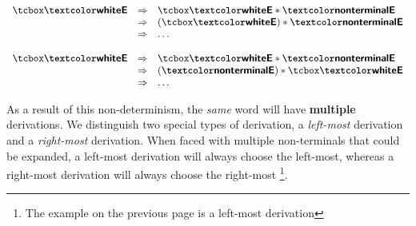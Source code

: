 \begin{center}
\begin{minipage}[t]{0.25\textwidth}
    \centering
     $\begin{array}{rcl}
      {\selectedNonTerminal{E}} &\Rightarrow& {\selectedNonTerminal{E} * \nonterminal{E}} \\
      &\Rightarrow& (\selectedNonTerminal{E}) * \nonterminal{E}\\
     &\Rightarrow& \ldots\\
    \end{array}$
\end{minipage}%
\begin{minipage}[t]{0.25\textwidth}
    \centering
    $\begin{array}{rcl}
     {\selectedNonTerminal{E}} &\Rightarrow& {\selectedNonTerminal{E} * \nonterminal{E}} \\
      &\Rightarrow& (\nonterminal{E}) * \selectedNonTerminal{E}\\
      &\Rightarrow&  \ldots\\
    \end{array}$
\end{minipage}
\end{center}

As a result of this non-determinism, the \textit{same} word will have \textbf{multiple} derivations. We distinguish two special types of derivation, a \textit{left-most} derivation and a \textit{right-most} derivation. When faced with multiple non-terminals that could be expanded, a left-most derivation will always choose the left-most, whereas a right-most derivation will always choose the right-most \footnote{The example on the previous page is a left-most derivation}. \label{definition:leftmostderivation}

